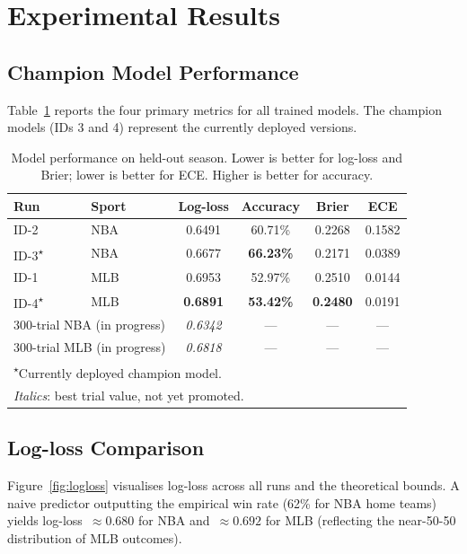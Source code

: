 \documentclass[conference]{IEEEtran}
\begin{document}
\section{Experimental Results}
\label{sec:results}

\subsection{Champion Model Performance}

Table~\ref{tab:results} reports the four primary metrics for all
trained models.  The champion models (IDs 3 and 4) represent the
currently deployed versions.

\begin{table}[t]
\centering
\caption{Model performance on held-out season.  Lower is better for
log-loss and Brier; lower is better for ECE.  Higher is better for
accuracy.}
\label{tab:results}
\small
\begin{tabular}{llcccc}
\toprule
\textbf{Run} & \textbf{Sport} & \textbf{Log-loss} & \textbf{Accuracy} & \textbf{Brier} & \textbf{ECE} \\
\midrule
ID-2 & NBA & 0.6491 & 60.71\% & 0.2268 & 0.1582 \\
ID-3\textsuperscript{$\star$} & NBA & 0.6677 & \textbf{66.23\%} & 0.2171 & 0.0389 \\
ID-1 & MLB & 0.6953 & 52.97\% & 0.2510 & 0.0144 \\
ID-4\textsuperscript{$\star$} & MLB & \textbf{0.6891} & \textbf{53.42\%} & \textbf{0.2480} & 0.0191 \\
\midrule
\multicolumn{2}{l}{300-trial NBA (in progress)} & \textit{0.6342} & — & — & — \\
\multicolumn{2}{l}{300-trial MLB (in progress)} & \textit{0.6818} & — & — & — \\
\bottomrule
\multicolumn{6}{l}{\textsuperscript{$\star$}Currently deployed champion model.}\\
\multicolumn{6}{l}{\textit{Italics}: best trial value, not yet promoted.}
\end{tabular}
\end{table}

\subsection{Log-loss Comparison}

Figure~\ref{fig:logloss} visualises log-loss across all runs and the
theoretical bounds.  A naive predictor outputting the empirical win
rate (62\% for NBA home teams) yields log-loss~$\approx 0.680$ for NBA
and~$\approx 0.692$ for MLB (reflecting the near-50-50 distribution of
MLB outcomes).
\end{document}
